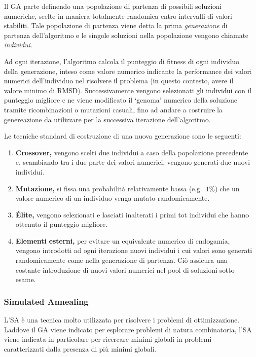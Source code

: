 \documentclass[10pt,a4paper]{article}
\begin{document}
Il GA parte definendo una popolazione di partenza di possibili soluzioni numeriche, scelte in maniera totalmente randomica entro intervalli di valori stabiliti.
Tale popolazione di partenza viene detta la prima \textit{generazione} di partenza dell'algoritmo e le singole soluzioni nella popolazione vengono chiamate \textit{individui}.

Ad ogni iterazione, l'algoritmo calcola il punteggio di fitness di ogni individuo della generazione, inteso come valore numerico indicante la performance dei valori numerici dell'individuo nel risolvere il problema (in questo contesto, avere il valore minimo di RMSD).
Successivamente vengono selezionati gli individui con il punteggio migliore e ne viene modificato il `genoma' numerico della soluzione tramite ricombinazioni o mutazioni casuali, fino ad andare a costruire la genereazione da utilizzare per la successiva iterazione dell'algoritmo.

Le tecniche standard di costruzione di una nuova generazione sono le seguenti:
\begin{enumerate}
    \item \textbf{Crossover,} vengono scelti due individui a caso della popolazione precedente e, scambiando tra i due parte dei valori numerici, vengono generati due nuovi individui.
    \item \textbf{Mutazione,} si fissa una probabilità relativamente bassa (e.g.~\(1\% \)) che un valore numerico di un individuo venga mutato randomicamente.
    \item \textbf{Élite,} vengono selezionati e lasciati inalterati i primi tot individui che hanno ottenuto il punteggio migliore.
    \item \textbf{Elementi esterni,} per evitare un equivalente numerico di endogamia, vengono introdotti ad ogni iterazione nuovi individui i cui valori sono generati randomicamente come nella generazione di partenza. Ciò assicura una costante introduzione di nuovi valori numerici nel pool di soluzioni sotto esame.
\end{enumerate}

\subsubsection{Simulated Annealing}

L'SA è una tecnica molto utilizzata per risolvere i problemi di ottimizzazione. Laddove il GA viene indicato per esplorare problemi di natura combinatoria, l'SA viene indicata in particolare per ricercare minimi globali in problemi caratterizzati dalla presenza di più minimi globali.
\end{document}
